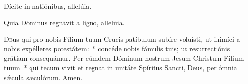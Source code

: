 \vv Dícite in natiónibus, allelúia.

\rr Quia Dóminus regnávit a ligno, allelúia.


\lettrine{D}{e}us qui pro nobis Fílium tuum Crucis patíbulum subíre voluísti, ut inimíci a nobis expélleres potestátem:~* concéde nobis fámulis tuis; ut resurrectiónis grátiam consequámur. Per eúmdem Dóminum nostrum Jesum Christum Fílium tuum~* qui tecum vivit et regnat in unitáte Spíritus Sancti, Deus, per ómnia sǽcula sæculórum. \rr Amen.